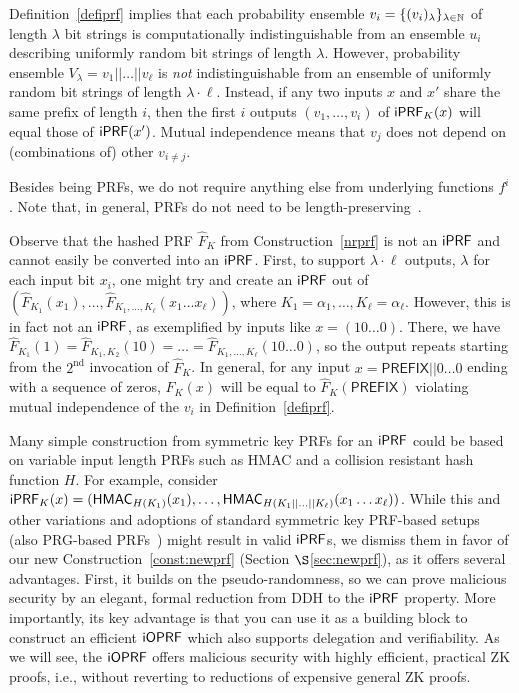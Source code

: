 Definition~\ref{defiprf} implies that each probability ensemble
$v_i=\{(v_i)_\lambda\}_{\lambda\in{\mathbb{N}}}$ of length $\lambda$ bit strings
is computationally indistinguishable from an ensemble $u_i$ describing
uniformly random bit strings of length $\lambda$. However, probability
ensemble $V_\lambda=v_1||\ldots||v_\ell$ is \emph{not}
indistinguishable from an ensemble of uniformly random bit strings of
length $\lambda\cdot\ell$. Instead, if any two inputs $x$ and $x'$
share the same prefix of length $i$, then the first $i$ outputs
$(v_1,\ldots,v_i)$ of $\mathsf{i}\mathsf{PRF}_K(x)$ will equal those of $\mathsf{i}\mathsf{PRF}(x')$. Mutual independence means that $v_j$ does not depend on (combinations of) other $v_{i\neq{}j}$.


Besides being PRFs, we do not require anything else from underlying
functions $f^i$. Note that, in general, PRFs do not need to be
length-preserving~\cite{nonlengthpres}.

Observe that the hashed \citeauthor{prf} PRF $\hat{F}_K$ from
Construction~\ref{nrprf} is not an $\mathsf{i}\mathsf{PRF}$ and cannot easily be
converted into an $\mathsf{i}\mathsf{PRF}$. First, to support $\lambda\cdot\ell$
outputs, $\lambda$ for each input bit $x_i$, one might try and create
an $\mathsf{i}\mathsf{PRF}$ out of
$(\hat{F}_{K_1}(x_1),\ldots,\hat{F}_{K_1,\ldots,K_\ell}(x_1\ldots{}x_\ell))$,
where $K_1=\alpha_1,\ldots,K_\ell=\alpha_\ell$.  However, this is in
fact not an $\mathsf{i}\mathsf{PRF}$, as exemplified by inputs like
$x=(10\ldots{}0)$. There, we have
$\hat{F}_{K_1}(1)=\hat{F}_{K_1,K_2}(10)=\ldots=\hat{F}_{K_1,\ldots,K_\ell}(10\ldots{}0)$,
so the output repeats starting from the $2^\text{nd}$ invocation of
$\hat{F}_K$. In general, for any input $x=\mathsf{PREFIX}||0\ldots{}0$ ending
with a sequence of zeros, $\hat{F}_K(x)$ will be equal to
$\hat{F}_K(\mathsf{PREFIX})$ violating mutual independence of the $v_i$ in Definition~\ref{defiprf}.

Many simple construction from symmetric key PRFs for an $\mathsf{i}\mathsf{PRF}$
could be based on variable input length PRFs such as HMAC and a
collision resistant hash function $H$. For example, consider
$\mathsf{i}\mathsf{PRF}_K(x)=(\mathsf{HMAC}_{H(K_1)}(x_1),\ldots,\mathsf{HMAC}_{H(K_1||\ldots||K_\ell)}(x_1\ldots{}x_\ell))$.
While this and other variations and adoptions of standard symmetric key PRF-based setups (also PRG-based PRFs~\cite{ggm}) might result in valid $\mathsf{i}\mathsf{PRF}$s,
we dismiss them in favor of our new 
Construction~\ref{const:newprf} (Section $\S$\ref{sec:newprf}), as it offers several advantages. First, it
builds on the \citeauthor{prf} pseudo-randomness, so we can prove malicious security by an elegant, formal reduction from DDH to the $\mathsf{i}\mathsf{PRF}$ property.
More importantly, its key advantage
is that you can use it as a building block to construct an efficient $\mathsf{i}\mathsf{OPRF}$
which also supports delegation and verifiability. As we will see, the $\mathsf{i}\mathsf{OPRF}$ offers malicious security with highly efficient, practical ZK proofs, i.e., without reverting to reductions of expensive general ZK proofs. 

